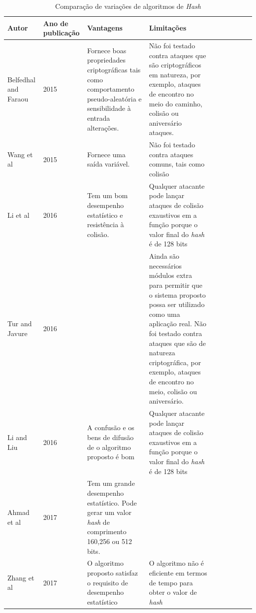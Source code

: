 \documentclass[conference]{IEEEtran}
\begin{document}
\begin{table}[hbt!]
\centering
\begin{adjustbox}{width=\textwidth}
\begin{tabular}{p{}p{}p{}p{}p{}|l|l|l|l|l|}
    \hline
    Autor & Ano de publicação & Vantagens & Limitações \\
    \hline
    Belfedhal and Faraou \cite{belfedhal2015building} & 2015 & Fornece boas propriedades criptográficas tais como comportamento pseudo-aleatória e sensibilidade à entrada alterações. & Não foi testado contra ataques que são criptográficos em natureza, por exemplo, ataques de encontro no meio do caminho, colisão ou aniversário ataques. \\
    \hline
    Wang et al \cite{wang2015hash} & 2015 & Fornece uma saída variável. & Não foi testado contra ataques comuns, tais como colisão \\
    \hline
    Li et al \cite{li2016chaotic} & 2016 & Tem um bom desempenho estatístico e resistência à colisão. & Qualquer atacante pode lançar ataques de colisão exaustivos em a função porque o valor final do \textit{hash} é de 128 bits \\
    \hline
    Tur and Javure \cite{turvcanik2016hash} & 2016 &  & Ainda são necessários módulos extra para permitir que o sistema proposto possa ser utilizado como uma aplicação real.
    Não foi testado contra ataques que são de natureza criptográfica, por exemplo, ataques de encontro no meio, colisão ou aniversário. \\
    \hline
    Li and Liu \cite{li2017fast} & 2016 & A confusão e os bens de difusão de o algoritmo proposto é bom & Qualquer atacante pode lançar ataques de colisão exaustivos em a função porque o valor final do \textit{hash} é de 128 bits \\
    \hline
    Ahmad et al \cite{ahmad2017simple} & 2017 & Tem um grande desempenho estatístico. Pode gerar um valor \textit{hash} de comprimento 160,256 ou 512 bits. &  \\
    \hline
    Zhang et al \cite{zhang2017parallel} & 2017 & O algoritmo proposto satisfaz o requisito de desempenho estatístico & O algoritmo não é eficiente em termos de tempo para obter o valor de \textit{hash} \\
    \hline
\end{tabular}
\end{adjustbox}
\vspace{1em}
\caption{Comparação de variações de algoritmos de \textit{Hash}}
\label{hashcomptable}
\end{table}
\cite{SHS2015}
\end{document}
